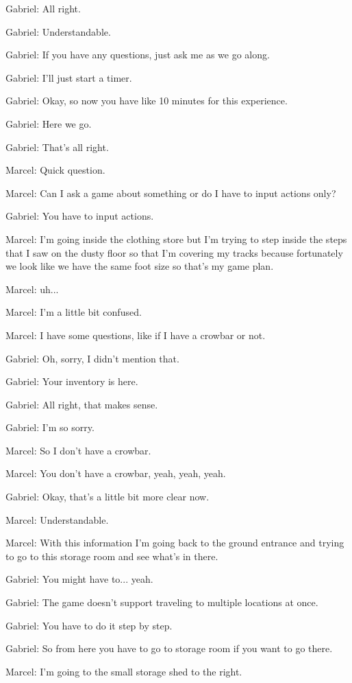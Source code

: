 Gabriel: All right.

Gabriel: Understandable.

Gabriel: If you have any questions, just ask me as we go along.

Gabriel: I'll just start a timer.

Gabriel: Okay, so now you have like 10 minutes for this experience.

Gabriel: Here we go.

Gabriel: That's all right.

Marcel: Quick question.

Marcel: Can I ask a game about something or do I have to input actions only?

Gabriel: You have to input actions.

Marcel: I'm going inside the clothing store but I'm trying to step inside the steps that I saw on the dusty floor so that I'm covering my tracks because fortunately we look like we have the same foot size so that's my game plan.

Marcel: uh...

Marcel: I'm a little bit confused.

Marcel: I have some questions, like if I have a crowbar or not.

Gabriel: Oh, sorry, I didn't mention that.

Gabriel: Your inventory is here.

Gabriel: All right, that makes sense.

Gabriel: I'm so sorry.

Marcel: So I don't have a crowbar.

Marcel: You don't have a crowbar, yeah, yeah, yeah.

Gabriel: Okay, that's a little bit more clear now.

Marcel: Understandable.

Marcel: With this information I'm going back to the ground entrance and trying to go to this storage room and see what's in there.

Gabriel: You might have to... yeah.

Gabriel: The game doesn't support traveling to multiple locations at once.

Gabriel: You have to do it step by step.

Gabriel: So from here you have to go to storage room if you want to go there.

Marcel: I'm going to the small storage shed to the right.

